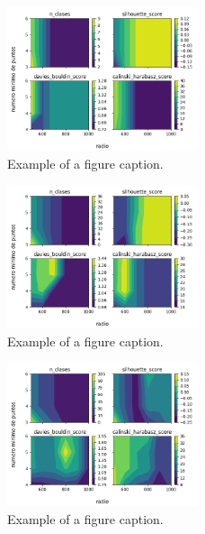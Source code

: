 \begin{figure}[htbp]
\centerline{\includegraphics[width=0.5\textwidth]{graficos_experimentos/dbscan/caracteristicos4_pca0.9.png}}
\caption{Example of a figure caption.}
\label{graficos_experimentos/dbscan/caracteristicos4_pca0.9.png}
\end{figure}
 
\begin{figure}[htbp]
\centerline{\includegraphics[width=0.5\textwidth]{graficos_experimentos/dbscan/caracteristicos4_pca0.95.png}}
\caption{Example of a figure caption.}
\label{graficos_experimentos/dbscan/caracteristicos4_pca0.95.png}
\end{figure}
 
\begin{figure}[htbp]
\centerline{\includegraphics[width=0.5\textwidth]{graficos_experimentos/dbscan/caracteristicos4_pca0.99.png}}
\caption{Example of a figure caption.}
\label{graficos_experimentos/dbscan/caracteristicos4_pca0.99.png}
\end{figure}
 
